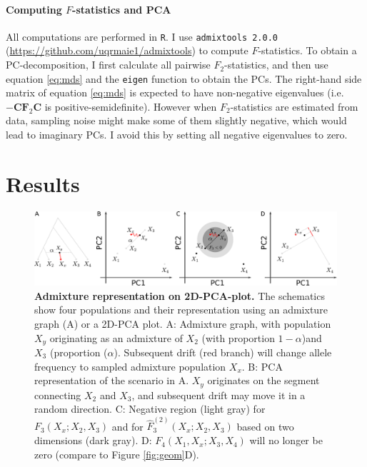 \documentclass[12pt,fullpage, a4paper]{article}
\newcommand{\MC}{\mathbf{C}} %
\newcommand{\MF}{\mathbf{F}_2} %
\begin{document}
\paragraph{Computing $F$-statistics and PCA}
All computations are performed in \texttt{R}. I use \texttt{admixtools 2.0.0} (\url{https://github.com/uqrmaie1/admixtools}) to compute $F$-statistics. To obtain a PC-decomposition, I first calculate all pairwise $F_2$-statistics, and then use equation \ref{eq:mds} and the \texttt{eigen} function to obtain the PCs. The right-hand side matrix of equation \ref{eq:mds} is expected to have non-negative eigenvalues (i.e. $-\MC\MF\MC$ is positive-semidefinite). However when $F_2$-statistics are estimated from data, sampling noise might make some of them  slightly negative, which would lead to imaginary PCs. I avoid this by setting all negative eigenvalues to zero.

\section{Results}



\begin{figure}[!ht]
	\includegraphics[width=\textwidth]{figures/fstats_admixture_pca.pdf}
	\caption{\textbf{Admixture representation on 2D-PCA-plot.} The schematics show four populations and their representation using an admixture graph (A) or a 2D-PCA plot. A: Admixture graph, with population $X_y$ originating as an admixture of $X_2$ (with proportion $1-\alpha$)and $X_3$ (proportion ($\alpha$). Subsequent drift (red branch) will change allele frequency to sampled admixture population $X_x$. B: PCA representation of the scenario in A. $X_y$ originates on the segment connecting $X_2$ and $X_3$, and subsequent drift may move it in a random direction. C: Negative region (light gray) for $F_3(X_x; X_2, X_3)$ and for $\hat{F}_3^{(2)}(X_x; X_2, X_3)$ based on two dimensions (dark gray). D: $F_4(X_1, X_x; X_3, X_4)$ will no longer be zero (compare to Figure \ref{fig:geom}D). }
	\label{fig:admix}
\end{figure}
\end{document}

